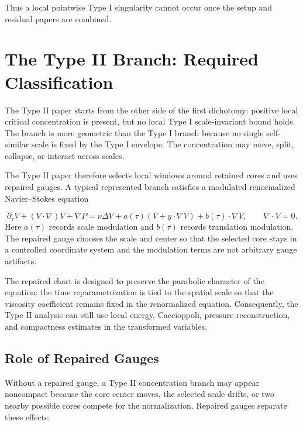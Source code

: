 \documentclass[11pt]{amsart}
\begin{document}
Thus a local pointwise Type I singularity cannot occur once the setup and residual papers are combined.

\section{The Type II Branch: Required Classification}

The Type II paper starts from the other side of the first dichotomy: positive local critical concentration is present, but no local Type I scale-invariant bound holds.  The branch is more geometric than the Type I branch because no single self-similar scale is fixed by the Type I envelope.  The concentration may move, split, collapse, or interact across scales.

The Type II paper therefore selects local windows around retained cores and uses repaired gauges.  A typical represented branch satisfies a modulated renormalized Navier--Stokes equation

\[
  \partial_\tau V+(V\cdot\nabla)V+\nabla P
  =
  \nu\Delta V+a(\tau)(V+y\cdot\nabla V)+b(\tau)\cdot\nabla V,
  \qquad \nabla\cdot V=0.
\]
Here \(a(\tau)\) records scale modulation and \(b(\tau)\) records translation modulation.  The repaired gauge chooses the scale and center so that the selected core stays in a controlled coordinate system and the modulation terms are not arbitrary gauge artifacts.

The repaired chart is designed to preserve the parabolic character of the equation: the time reparametrization is tied to the spatial scale so that the viscosity coefficient remains fixed in the renormalized equation.  Consequently, the Type II analysis can still use local energy, Caccioppoli, pressure reconstruction, and compactness estimates in the transformed variables.

\subsection{Role of Repaired Gauges}

Without a repaired gauge, a Type II concentration branch may appear noncompact because the core center moves, the selected scale drifts, or two nearby possible cores compete for the normalization.  Repaired gauges separate these effects:
\end{document}
